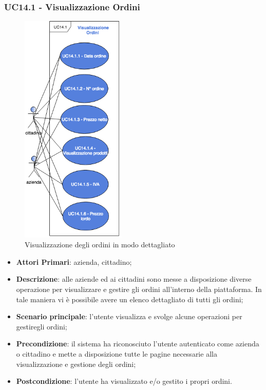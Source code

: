\subsubsection{UC14.1 - Visualizzazione Ordini}
\begin{figure}[H]
	\includegraphics[width=5cm]{res/images/UC14-1VisualOrdini.png}
	\centering
	\caption{Visualizzazione degli ordini in modo dettagliato}
\end{figure}
\begin{itemize}
	\item \textbf{Attori Primari}: azienda, cittadino;
	\item \textbf{Descrizione}: alle aziende ed ai cittadini sono messe a disposizione diverse operazione per visualizzare e gestire gli ordini all'interno della piattaforma. In tale maniera vi è possibile avere un elenco dettagliato di tutti gli ordini;
	\item \textbf{Scenario principale}: l'utente visualizza e svolge alcune operazioni per gestiregli ordini;
	\item \textbf{Precondizione}: il sistema ha riconosciuto l'utente autenticato come azienda o cittadino e mette a disposizione tutte le pagine necessarie alla visualizzazione e gestione degli ordini;
	\item \textbf{Postcondizione}: l'utente ha visualizzato e/o gestito i propri ordini.
\end{itemize} 

